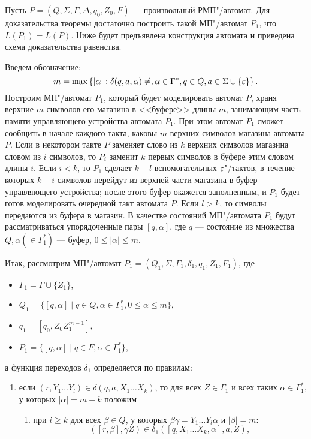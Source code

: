 \begin{myproof}
Пусть $P=(Q,\Sigma,\Gamma,\Delta,q_0,Z_0,F)$ --- произвольный РМП"/автомат. Для доказательства теоремы достаточно построить такой МП"/автомат $P_1$, что $L(P_1)=L(P)$. Ниже будет предъявлена конструкция автомата и приведена схема доказательства равенства.

Введем обозначение:
\[
    m = \max\left\{|\alpha|: \delta(q,a,\alpha)\neq, \alpha\in\Gamma^*,
                q\in Q, a\in\Sigma\cup\{\varepsilon\}\right\}.
\]
Построим МП"/автомат $P_1$, который будет моделировать автомат $P$, храня верхние $m$ символов его магазина в <<буфере>> длины $m$, занимающим часть памяти управляющего устройства автомата $P_1$. При этом автомат $P_1$ сможет сообщить в начале каждого такта, каковы $m$ верхних символов магазина автомата $P$. Если в некотором такте $P$ заменяет слово из $k$ верхних символов магазина словом из $i$ символов, то $P_i$ заменит $k$ первых символов в буфере этим словом длины $i$. Если $i<k$, то $P_1$ сделает $k-l$ вспомогательных $\varepsilon$"/тактов, в течение которых $k-i$ символов перейдут из верхней части магазина в буфер управляющего устройства; после этого буфер окажется заполненным, и $P_1$ будет готов моделировать очередной такт автомата $P$. Если $l>k$, то символы передаются из буфера в магазин. В качестве состояний МП"/автомата $P_1$ будут рассматриваться упорядоченные пары $[q,\alpha]$, где $q$ --- состояние из множества $Q, \alpha (\in\Gamma_1^*)$ --- буфер, $0\le|\alpha|\le m$.

Итак, рассмотрим МП"/автомат $P_1=(Q_1,\Sigma,\Gamma_1,\delta_1,q_1,Z_1,F_1)$, где
\begin{itemize}
\item $\Gamma_1 = \Gamma\cup\{Z_1\}$,
\item $Q_1 = \{[q,\alpha]\mid q\in Q, \alpha\in\Gamma^*_1, 0\le\alpha\le m\}$,
\item $q_1 = [q_0,Z_0Z_1^{m-1}]$,
\item $P_1 = \{[q,\alpha]\mid q\in F, \alpha\in\Gamma_1^*\}$,
\end{itemize}
а функция переходов $\delta_1$ определяется по правилам:
\begin{enumerate}
    \item если $(r,Y_1 \ldots Y_l)\in\delta(q,a,X_1\ldots X_k)$, то
    для всех $Z\in\Gamma_1$ и всех таких $\alpha\in\Gamma_1^*$,
    у которых $|\alpha|=m-k$ положим

    \begin{enumerate}
        \renewcommand{\labelenumii}{\arabic{enumi}.\arabic{enumii})}
        \item при $i\ge k$ для всех $\beta\in Q$, у которых
        $\beta\gamma=Y_1\ldots Y_l\alpha$ и $|\beta|=m$:
        \[
        ([r,\beta],\gamma Z)\in\delta_1([q,X_1\ldots X_k,\alpha],a,Z),
        \]


\end{enumerate}
\end{enumerate}
\end{myproof}
